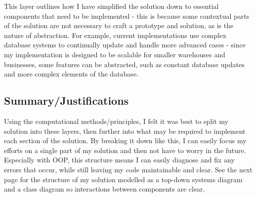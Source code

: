 This layer outlines how I have simplified the solution down to essential components that need to be implemented - this is because some contextual parts of the solution are not necessary to craft a prototype and solution, as is the nature of abstraction. For example, current implementations use complex database systems to continually update and handle more advanced cases - since my implementation is designed to be scalable for smaller warehouses and businesses, some features can be abstracted, such as constant database updates and more complex elements of the database.


\subsection{Summary/Justifications}

Using the computational methods/principles, I felt it was best to split my solution into these layers, then further into what may be required to implement each section of the solution. By breaking it down like this, I can easily focus my efforts on a single part of my solution and then not have to worry in the future. Especially with OOP, this structure means I can easily diagnose and fix any errors that occur, while still leaving my code maintainable and clear. See the next page for the structure of my solution modelled as a top-down systems diagram and a class diagram so interactions between components are clear.

\newpage


